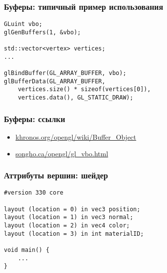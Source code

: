 \documentclass{beamer}
\begin{document}
\begin{frame}[fragile]
\frametitle{Буферы: типичный пример использования}
\begin{verbatim}
GLuint vbo;
glGenBuffers(1, &vbo);

std::vector<vertex> vertices;
...

glBindBuffer(GL_ARRAY_BUFFER, vbo);
glBufferData(GL_ARRAY_BUFFER,
    vertices.size() * sizeof(vertices[0]),
    vertices.data(), GL_STATIC_DRAW);
\end{verbatim}
\end{frame}

\begin{frame}[fragile]
\frametitle{Буферы: ссылки}
\begin{itemize}
\item \href{https://www.khronos.org/opengl/wiki/Buffer_Object}{khronos.org/opengl/wiki/Buffer\_Object}
\item \href{https://www.songho.ca/opengl/gl_vbo.html}{songho.ca/opengl/gl\_vbo.html}
\end{itemize}
\end{frame}

\begin{frame}[fragile]
\frametitle{Аттрибуты вершин: шейдер}
\begin{verbatim}
#version 330 core

layout (location = 0) in vec3 position;
layout (location = 1) in vec3 normal;
layout (location = 2) in vec4 color;
layout (location = 3) in int materialID;

void main() {
    ...
}
\end{verbatim}
\end{frame}
\end{document}
